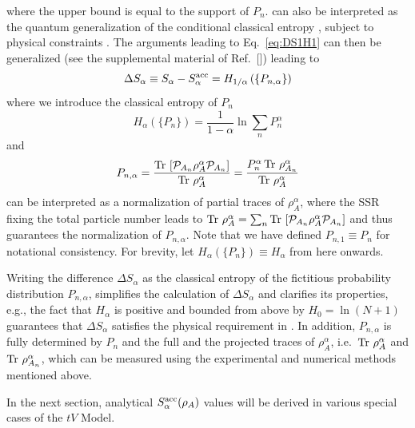 %
where the upper bound is equal to the support of $P_n$.  can also be interpreted as the quantum generalization of the conditional classical \ren entropy \cite{Cachin97entropymeasures,GolshaniPashaYari:2009,Hayashi:2011,SKORIC:2011el,FehrBerens2014}, subject to physical constraints \cite{Barghathi:2018oe}. The arguments leading to Eq.~\eqref{eq:DS1H1} can then be generalized (see the supplemental material of Ref.~[\cite{Barghathi:2018oe}]) leading to 
%
\begin{equation}
    \Delta S_{\alpha}\equiv  S_{\alpha} - S_{\alpha}^{{\rm acc}} = H_{{1}/{\alpha}}\left(\{P_{n,\alpha}\}\right)
\label{eq:S_alpha_acc5}
\end{equation}
%
where we introduce the classical \ren entropy of $P_n$
%
\begin{equation}
    H_{\alpha}\left(\{P_n\}\right)=\frac{1}{1-\alpha}\ln\sum_n P_n^{\alpha} 
\label{eq:Halpha}
\end{equation}
%
and
%
\begin{equation}
    P_{n,\alpha}=\frac{\operatorname{Tr}\, \left[{\mathcal{P}}_{A_{n}} \rho_A^{\alpha} {\mathcal{P}}_{A_{n}}\right]}{\operatorname{Tr}\, \rho_A^{\alpha}}=\frac{ P_n^\alpha\operatorname{Tr}\, \rho_{A_n}^{\alpha}}{\operatorname{Tr}\, \rho_A^{\alpha}}
\label{eq:Pna}
\end{equation}
%
can be interpreted as a normalization of partial traces of $\rho_A^{\alpha}$, where the SSR fixing the total particle number leads to $\operatorname{Tr}\, \rho_A^{\alpha}=\sum_n \operatorname{Tr}\, \left[{\mathcal{P}}_{A_{n}} \rho_A^{\alpha} {\mathcal{P}}_{A_{n}}\right]$ and thus guarantees the normalization of $P_{n,\alpha}$. Note that we have defined $P_{n,1} \equiv P_n$ for notational consistency. For brevity, let $H_{\alpha}(\{P_n\}) \equiv H_{\alpha}$ from here onwards. 

Writing the difference $\Delta S_{\alpha}$ as the classical \ren entropy of the fictitious probability distribution $P_{n,\alpha}$, simplifies the calculation of $\Delta S_{\alpha}$ and clarifies its properties, e.g., the fact that $H_{\alpha}$  is positive and bounded from above by $ H_{0}=\ln(N+1)$ guarantees that $\Delta S_{\alpha}$ satisfies the physical requirement in . \cite{Barghathi:2018oe} In addition, $P_{n,\alpha}$ is fully determined by $P_n$ and the full and the projected traces of $\rho_A^{\alpha}$, i.e.~$\operatorname{Tr}\, \rho_{A}^{\alpha}$ and $\operatorname{Tr}\, \rho_{A_n}^{\alpha}$, which can be measured using the experimental and numerical methods mentioned above.    

In the next section, analytical $S_{\alpha}^{\rm acc}(\rho_A)$ values will be derived in various special cases of the $tV$ Model.

